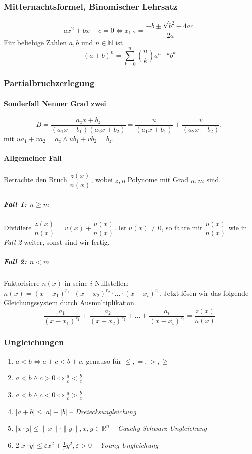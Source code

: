 \documentclass[a4paper, 9pt, DIV=24]{scrartcl}
\newcommand{\N}{\mathbb{N}}
\begin{document}
\subsubsection{Mitternachtsformel, Binomischer Lehrsatz}
\[ ax^2 + bx + c = 0 \iff x_{1,2} = \frac{-b \pm \sqrt{b^2 - 4ac}}{2a} \]
Für beliebige Zahlen $a, b$ und $n \in \N$ ist
\[ (a+b)^n = \sum^{n}_{k=0}{{n \choose k} a^{n-k}b^{k}}\]

\subsubsection{Partialbruchzerlegung}
\paragraph{Sonderfall Nenner Grad zwei}
\[
 B = \dfrac{a_zx+b_z}{(a_1x+b_1)(a_2x+b_2)} = \dfrac{u}{(a_1x+b_1)} + \dfrac{v}{(a_2x+b_2)},
\]
mit $ua_1 + va_2 = a_z \wedge ub_1 + vb_2 = b_z$.
\paragraph{Allgemeiner Fall}
Betrachte den Bruch $\dfrac{z(x)}{n(x)}$, wobei $z,n$ Polynome mit Grad $n,m$ sind.
\subparagraph{Fall 1: $n \geq m$}
Dividiere $\dfrac{z(x)}{n(x)} = v(x) + \dfrac{u(x)}{n(x)}$.
Ist $u(x) \neq 0$, so fahre mit $\dfrac{u(x)}{n(x)}$ wie in \emph{Fall 2} weiter, sonst sind wir fertig.
\subparagraph{Fall 2: $n < m$}
Faktorisiere $n(x)$ in seine $i$ Nullstellen: $n(x) = (x-x_1)^{r_1} \cdot (x-x_2)^{r_2} \cdot \dots \cdot (x-x_i)^{r_i}.$
Jetzt lösen wir das folgende Gleichungssystem durch Ausmultiplikation.
\[ \frac{a_1}{(x-x_1)^{r_1}} + \frac{a_2}{(x-x_2)^{r_2}} + \dots + \frac{a_i}{(x-x_i)^{r_i}} = \frac{z(x)}{n(x)} \]

\subsubsection{Ungleichungen}
\begin{enumerate}[label={(}\arabic*{)}]
 \item $a < b \iff a + c < b + c$, genauso für $\leq,=,>,\geq$
 \item $a < b \wedge c > 0 \iff \frac{a}{c} < \frac{b}{c}$
 \item $a < b \wedge c < 0 \iff \frac{a}{c} > \frac{b}{c}$
 \item $|a+b| \leq |a| + |b|$ -- \emph{Dreiecksungleichung}
 \item $|x\cdot y| \leq \|x\|\cdot\|y\|, x,y \in \mathbb{R}^n$ -- \emph{Cauchy-Schwarz-Ungleichung}
 \item $2|x\cdot y| \leq \varepsilon x^2 + \frac{1}{\varepsilon}y^2, \varepsilon > 0$ -- \emph{Young-Ungleichung}
\end{enumerate}
\end{document}
